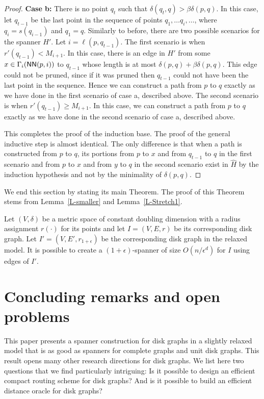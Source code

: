 \documentclass[proceedings]{stacs}
\theoremstyle{plain}\newtheorem{satz}[thm]{Satz}
\theoremstyle{definition}\newtheorem{crucial}[thm]{Crucial Definition}
\newcommand{\eps}{\epsilon}
\newcommand{\NN}{\mbox{\sf NN}}
\begin{document}
\begin{proof}
{\bf Case b:} There is no point $q_t$ such that $\delta(q_t,q)> \beta
\delta(p,q)$.
In this case, let $q_{t-1}$ be the last point in the sequence of
points $q_1,\ldots q_i, \ldots$, where $q_i = s(q_{i-1})$ and $q_1
= q$. Similarly to before, there are two possible scenarios for
the spanner $H'$. Let $i=\ell(p,q_{t-1})$. The first scenario is
when $r'(q_{t-1}) < M_{i+1}$. In this case, there is an edge in
$H'$ from some $x \in \Gamma_{i}(\NN(p,i))$ to $q_{t-1}$ whose
length is at most $\delta(p,q)+\beta\delta(p,q)$. This edge could
not be pruned, since if it was pruned then $q_{t-1}$ could not
have been the last point in the sequence. Hence we can construct a
path from $p$ to $q$ exactly as we have done in the first scenario
of case a, described above. The second scenario is when
$r'(q_{t-1}) \geq M_{i+1}$. In this case, we can construct a path
from $p$ to $q$ exactly as we have done in the second scenario of
case a, described above.

This completes the proof of the induction base. The proof of the
general inductive step is almost identical. The only difference is
that when a path is constructed from $p$ to $q$, its portions from
$p$ to $x$ and from $q_{t-1}$ to $q$ in the first scenario and
from $p$ to $x$ and from $y$ to $q$ in the second scenario exist
in $\hat{H}$ by the induction hypothesis and not by the minimality
of $\delta(p,q)$.
\end{proof}

We end this section by stating its main Theorem. The proof of this
Theorem stems from Lemma~\ref{L-smaller} and
Lemma~\ref{L-Stretch1}.

\begin{theorem}
Let $(V,\delta)$ be a metric space of constant doubling dimension
with a radius assignment $r(\cdot)$ for its points and let
$I=(V,E,r)$ be its corresponding disk graph. Let
$I'=(V,E',r_{1+\eps})$ be the corresponding disk graph in the
relaxed model. It is possible to create a $(1+\eps)$-spanner of
size $O(n/\eps^d)$ for $I$ using edges of $I'$.
\end{theorem}

\section{Concluding remarks and open problems}
\label{s:con}


This paper presents a spanner construction for disk graphs in a
slightly relaxed model that is as good as spanners for complete
graphs and unit disk graphs. This result opens many other research
directions for disk graphs. We list here two questions that we
find particularly intriguing: Is it possible to design an
efficient compact routing scheme for disk graphs? And is it
possible to build an efficient distance oracle for disk graphs?



\end{document}

